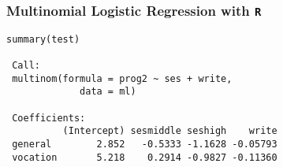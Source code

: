 \documentclass[00-GLMregslides.tex]{subfiles}
\begin{document}
\begin{frame}[fragile]

\frametitle{Multinomial Logistic Regression with \texttt{R}}
\large

	\begin{verbatim}
summary(test)
 
 Call:
 multinom(formula = prog2 ~ ses + write, 
             data = ml)
 
 Coefficients:
          (Intercept) sesmiddle seshigh    write
 general        2.852   -0.5333 -1.1628 -0.05793
 vocation       5.218    0.2914 -0.9827 -0.11360
\end{verbatim}

\end{frame}
\end{document}
